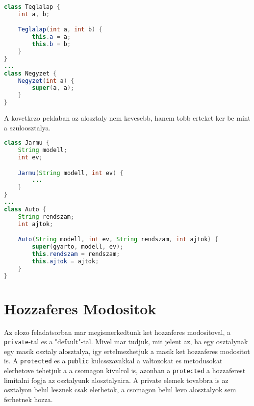 \documentclass{article}
\let\l\lstinline
\begin{document}
\begin{lstlisting}[language=Java, caption=Szuloosztaly konstruktoranak meghivasa]
class Teglalap {
    int a, b;

    Teglalap(int a, int b) {
        this.a = a;
        this.b = b;
    }
}
...
class Negyzet {
    Negyzet(int a) {
        super(a, a);
    }
}
\end{lstlisting}


A kovetkezo peldaban az alosztaly nem kevesebb, hanem tobb erteket ker be mint a szuloosztalya.

\begin{lstlisting}[language=Java, caption=Szuloosztaly konstruktoranak meghivasa]
class Jarmu {
    String modell;
    int ev;

    Jarmu(String modell, int ev) {
        ...
    }
}
...
class Auto {
    String rendszam;
    int ajtok;

    Auto(String modell, int ev, String rendszam, int ajtok) {
        super(gyarto, modell, ev);
        this.rendszam = rendszam;
        this.ajtok = ajtok;
    }
}
\end{lstlisting}

\newpage

\section{Hozzaferes Modositok}

Az elozo feladatsorban mar megismerkedtunk ket hozzaferes modositoval, a \l{private}-tal es a "default"-tal. Mivel mar tudjuk, mit jelent az, ha egy osztalynak egy masik osztaly alosztalya, igy ertelmezhetjuk a masik ket hozzaferes modositot is. A \l{protected} es a \l{public} kulcsszavakkal a valtozokat es metodusokat elerhetove tehetjuk a a csomagon kivulrol is, azonban a \l{protected} a hozzaferest limitalni fogja az osztalyunk alosztalyaira. A {private} elemek tovabbra is az osztalyon belul lesznek csak elerhetok, a csomagon belul levo alosztalyok sem ferhetnek hozza.
\end{document}
